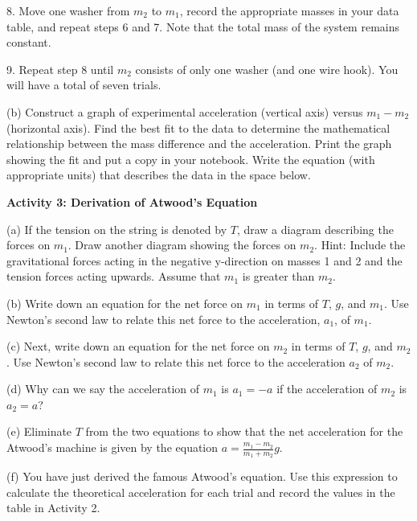 8. Move one washer from \( m_{2} \) to \( m_{1} \), record the appropriate
masses in your data table, and repeat steps 6 and 7. Note that the total mass
of the system remains constant. 

9. Repeat step 8 until \( m_{2} \) consists of only one washer (and one wire
hook). You will have a total of seven trials.

(b) Construct a graph of experimental acceleration (vertical axis) versus \( m_{1}  - m_{2} \) (horizontal axis). Find the best fit to the data to determine the mathematical relationship between the mass difference and the acceleration. Print the graph showing the fit and put a copy in your notebook. Write the equation (with appropriate units) that describes the data in the space below.
\answerspace{20mm}

\pagebreak[3]
\textbf{Activity 3: Derivation of Atwood's Equation }

(a) If the tension on the string is denoted by $T$, draw a diagram describing
the forces on \( m_{1} \). Draw another diagram showing the forces on \( m_{2} \).
Hint: Include the gravitational forces acting in the negative y-direction on
masses 1 and 2 and the tension forces acting upwards. Assume that \( m_{1} \)
is greater than \( m_{2} \).
\vspace{20mm}

(b) Write down an equation for the net force on \( m_{1} \) in terms of $T$, $g$, and \( m_{1} \). Use Newton's second law to relate this net force to the acceleration, \( a_{1} \), of \( m_{1} \).
\vspace{20mm}

(c) Next, write down an equation for the net force on \( m_{2} \) in terms
of $T$, $g$, and \( m_{2} \). Use Newton's second law to relate this net force
to the acceleration \( a_{2} \) of \( m_{2} \). 
\vspace{20mm}

(d) Why can we say the acceleration of \( m_{1} \) is \( a_{1} = -a\) if
the acceleration of \( m_{2} \) is \( a_{2} = a\)?
\vspace{20mm}

(e) Eliminate $T$ from the two equations to show that the net acceleration for
the Atwood's machine is given by the equation \( a=\frac{m_{1}-m_{2}}{m_{1}+m_{2}}g \). 
\vspace{40mm}

(f) You have just derived the famous Atwood's equation. Use this expression
to calculate the theoretical acceleration for each trial and record the values
in the table in Activity 2.

